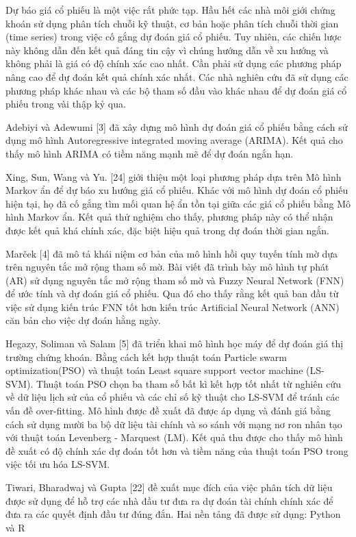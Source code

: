 Dự báo giá cổ phiếu là một việc rất phức tạp. Hầu hết các nhà môi giới chứng khoán sử dụng phân tích chuỗi kỹ thuật, cơ bản hoặc phân tích chuỗi thời gian (time series) trong việc cố gắng dự đoán giá cổ phiếu. Tuy nhiên, các chiến lược này không dẫn đến kết quả đáng tin cậy vì chúng hướng dẫn về xu hướng và không phải là giá có độ chính xác cao nhất. Cần phải sử dụng các phương pháp nâng cao để dự đoán kết quả chính xác nhất. Các nhà nghiên cứu đã sử dụng các phương pháp khác nhau và các bộ tham số đầu vào khác nhau để dự đoán giá cổ phiếu trong vài thập kỷ qua.

Adebiyi và Adewumi [3] đã xây dựng mô hình dự đoán giá cổ phiếu bằng cách sử dụng mô hình Autoregressive integrated moving average (ARIMA). Kết quả cho thấy mô hình ARIMA có tiềm năng mạnh mẽ để dự đoán ngắn hạn.

Xing, Sun, Wang và Yu. [24] giới thiệu một loại phương pháp dựa trên Mô hình Markov ẩn để dự báo xu hướng giá cổ phiếu. Khác với mô hình dự đoán cổ phiếu hiện tại, họ đã cố gắng tìm mối quan hệ ẩn tồn tại giữa các giá cổ phiếu bằng Mô hình Markov ẩn. Kết quả thử nghiệm cho thấy, phương pháp này có thể nhận được kết quả khá chính xác, đặc biệt hiệu quả trong dự đoán thời gian ngắn.

Marček [4] đã mô tả khái niệm cơ bản của mô hình hồi quy tuyến tính mờ dựa trên nguyên tắc mở rộng tham số mờ. Bài viết đã trình bày mô hình tự phát (AR) sử dụng nguyên tắc mở rộng tham số mờ và Fuzzy Neural Network (FNN) để ước tính và dự đoán giá cổ phiếu. Qua đó cho thấy rằng kết quả ban đầu từ việc sử dụng kiến trúc FNN tốt hơn kiến trúc Artificial Neural Network (ANN) căn bản cho việc dự đoán hằng ngày.

Hegazy, Soliman và Salam [5] đã triển khai mô hình học máy để dự đoán giá thị trường chứng khoán. Bằng cách kết hợp thuật toán Particle swarm optimization(PSO) và thuật toán Least square support vector machine (LS-SVM). Thuật toán PSO chọn ba tham số bất kì kết hợp tốt nhất từ nghiên cứu về dữ liệu lịch sử của cổ phiếu và các chỉ số kỹ thuật cho LS-SVM để tránh các vấn đề over-fitting. Mô hình được đề xuất đã được áp dụng và đánh giá bằng cách sử dụng mười ba bộ dữ liệu tài chính và so sánh với mạng nơ ron nhân tạo với thuật toán Levenberg - Marquest (LM). Kết quả thu được cho thấy mô hình đề xuất có độ chính xác dự đoán tốt hơn và tiềm năng của thuật toán PSO trong việc tối ưu hóa LS-SVM.

Tiwari, Bharadwaj và Gupta [22] đề xuất mục đích của việc phân tích dữ liệu được sử dụng để hỗ trợ các nhà đầu tư đưa ra dự đoán tài chính chính xác để đưa ra các quyết định đầu tư đúng đắn. Hai nền tảng đã được sử dụng: Python và R

